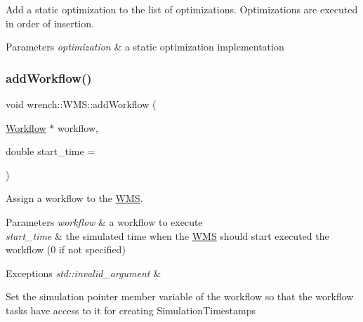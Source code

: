 Add a static optimization to the list of optimizations. Optimizations are executed in order of insertion. 


\begin{DoxyParams}{Parameters}
{\em optimization} & a static optimization implementation \\
\hline
\end{DoxyParams}
\mbox{\label{classwrench_1_1_w_m_s_afd2a6ae2f4d792046a6a17d5c0dc313f}} 
\subsubsection{\texorpdfstring{add\+Workflow()}{addWorkflow()}}
{\footnotesize\ttfamily void wrench\+::\+W\+M\+S\+::add\+Workflow (\begin{DoxyParamCaption}\item[{\hyperlink{classwrench_1_1_workflow}{Workflow} $\ast$}]{workflow,  }\item[{double}]{start\+\_\+time = {} }\end{DoxyParamCaption})}



Assign a workflow to the \hyperlink{classwrench_1_1_w_m_s}{W\+MS}. 


\begin{DoxyParams}{Parameters}
{\em workflow} & a workflow to execute \\
\hline
{\em start\+\_\+time} & the simulated time when the \hyperlink{classwrench_1_1_w_m_s}{W\+MS} should start executed the workflow (0 if not specified)\\
\hline
\end{DoxyParams}

\begin{DoxyExceptions}{Exceptions}
{\em std\+::invalid\+\_\+argument} & \\
\hline
\end{DoxyExceptions}
Set the simulation pointer member variable of the workflow so that the workflow tasks have access to it for creating Simulation\+Timestamps\mbox{\label{classwrench_1_1_w_m_s_ab84692140428dd81a6eccc115bf557e7}} 
